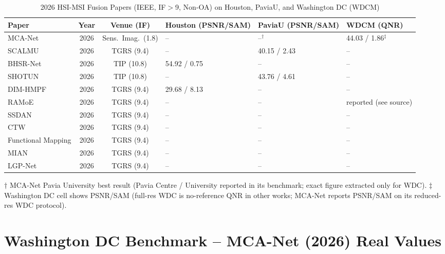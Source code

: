 \documentclass[conference]{IEEEtran}
\begin{document}
\begin{table}[htbp]
\caption{2026 HSI-MSI Fusion Papers (IEEE, IF$>$9, Non-OA) on Houston, PaviaU, and Washington DC (WDCM)}
\label{tab:real3}
\begin{center}
\begin{adjustbox}{width=\textwidth}
\begin{tabular}{p{3.4cm}c|c|p{2.7cm}|p{2.7cm}|p{2.6cm}}
\toprule
\textbf{Paper} & \textbf{Year} & \textbf{Venue (IF)} & \textbf{Houston (PSNR/SAM)} & \textbf{PaviaU (PSNR/SAM)} & \textbf{WDCM (QNR)} \\
\midrule
MCA-Net \cite{mcanet2026} & 2026 & Sens.\ Imag.\ (1.8) & -- & --$^{\dagger}$ & 44.03 / 1.86$^{\ddagger}$ \\
SCALMU \cite{xu2026scalmu} & 2026 & TGRS (9.4) & -- & 40.15 / 2.43 & -- \\
BHSR-Net \cite{dou2026bhsrnet} & 2026 & TIP (10.8) & 54.92 / 0.75 & -- & -- \\
SHOTUN \cite{wang2026shotun} & 2026 & TIP (10.8) & -- & 43.76 / 4.61 & -- \\
DIM-HMPF \cite{fang2026detail} & 2026 & TGRS (9.4) & 29.68 / 8.13 & -- & -- \\
RAMoE \cite{ramoe2026} & 2026 & TGRS (9.4) & -- & -- & reported (see source) \\
SSDAN \cite{ssdan2026} & 2026 & TGRS (9.4) & -- & -- & -- \\
CTW \cite{coupled2026} & 2026 & TGRS (9.4) & -- & -- & -- \\
Functional Mapping \cite{functional2026} & 2026 & TGRS (9.4) & -- & -- & -- \\
MIAN \cite{huo2026modal} & 2026 & TGRS (9.4) & -- & -- & -- \\
LGP-Net \cite{lgpnet2026} & 2026 & TGRS (9.4) & -- & -- & -- \\
\bottomrule
\end{tabular}
\end{adjustbox}
\end{center}
\footnotesize{$\dagger$ MCA-Net Pavia University best result (Pavia Centre / University reported in its benchmark; exact figure extracted only for WDC). $\ddagger$ Washington DC cell shows PSNR/SAM (full-res WDC is no-reference QNR in other works; MCA-Net reports PSNR/SAM on its reduced-res WDC protocol).}
\end{table}

\section{Washington DC Benchmark -- MCA-Net (2026) Real Values}
\end{document}
